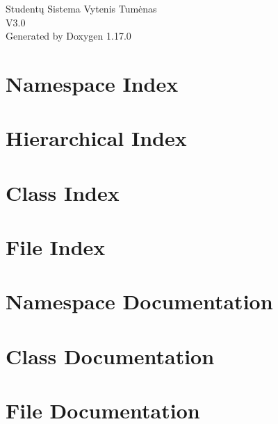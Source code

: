 \documentclass[twoside]{book}
\newcommand{\+}{\discretionary{\mbox{\scriptsize$\hookleftarrow$}}{}{}}
\newcommand{\clearemptydoublepage}{%
    \newpage{\pagestyle{empty}\cleardoublepage}%
  }
\begin{document}
  \raggedbottom
    \hypersetup{pageanchor=false,
                bookmarksnumbered=true,
                pdfencoding=unicode
               }
  \begin{titlepage}
  \vspace*{7cm}
  \begin{center}%
  {\Large Studentų Sistema Vytenis Tumėnas}\\
  [1ex]\large V3.\+0 \\
  \vspace*{1cm}
  {\large Generated by Doxygen 1.17.0}\\
  \end{center}
  \end{titlepage}
  \clearemptydoublepage
  \tableofcontents
  \clearemptydoublepage
  \hypersetup{pageanchor=true}
\chapter{Namespace Index}

\chapter{Hierarchical Index}

\chapter{Class Index}

\chapter{File Index}

\chapter{Namespace Documentation}

\chapter{Class Documentation}



\chapter{File Documentation}










  \backmatter
  \newpage
  \clearemptydoublepage
  \printindex
\end{document}

